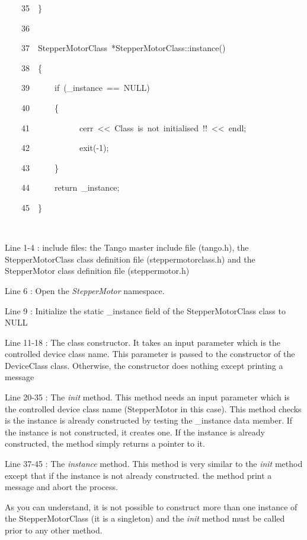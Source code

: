 \begin{lyxcode}
~~~~35~~\}

~~~~36~~

~~~~37~~StepperMotorClass~{*}StepperMotorClass::instance()

~~~~38~~\{

~~~~39~~~~~~if~(\_instance~==~NULL)

~~~~40~~~~~~\{

~~~~41~~~~~~~~~~~~cerr~<\textcompwordmark{}<~\textquotedbl{}Class~is~not~initialised~!!\textquotedbl{}~<\textcompwordmark{}<~endl;

~~~~42~~~~~~~~~~~~exit(-1);

~~~~43~~~~~~\}

~~~~44~~~~~~return~\_instance;

~~~~45~~\}

~
\end{lyxcode}


Line 1-4 : include files: the Tango master include file (tango.h),
the StepperMotorClass class definition file (steppermotorclass.h)
and the StepperMotor class definition file (steppermotor.h)

Line 6 : Open the \emph{StepperMotor} namespace.

Line 9 : Initialize the static \_instance field of the StepperMotorClass
class to NULL

Line 11-18 : The class constructor. It takes an input parameter which
is the controlled device class name. This parameter is passed to the
constructor of the DeviceClass class. Otherwise,
the constructor does nothing except printing a message

Line 20-35 : The \emph{init} method. This method needs
an input parameter which is the controlled device class name (StepperMotor
in this case). This method checks is the instance is already constructed
by testing the \_instance data member. If the instance is not constructed,
it creates one. If the instance is already constructed, the method
simply returns a pointer to it.

Line 37-45 : The \emph{instance} method. This method is very similar
to the \emph{init} method except that if the instance is not already
constructed. the method print a message and abort the process.

As you can understand, it is not possible to construct more than one
instance of the StepperMotorClass (it is a singleton)
and the \emph{init} method must be called prior to any other method.


